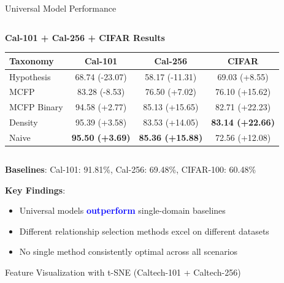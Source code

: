 \documentclass[aspectratio=169]{beamer}
\begin{document}
\begin{frame}{Universal Model Performance}
\begin{columns}[T]
        \begin{column}{0.48\textwidth}
            \textbf{Cal-101 + Cal-256 + CIFAR Results}
            \begin{table}[h]
                \centering
                \tiny
                \begin{tabular}{lccc}
                    \toprule
                    \textbf{Taxonomy} & \textbf{Cal-101}       & \textbf{Cal-256}        & \textbf{CIFAR}          \\
                    \midrule
                    Hypothesis        & 68.74 (-23.07)         & 58.17 (-11.31)          & 69.03 (+8.55)           \\
                    MCFP              & 83.28 (-8.53)          & 76.50 (+7.02)           & 76.10 (+15.62)          \\
                    MCFP Binary       & 94.58 (+2.77)          & 85.13 (+15.65)          & 82.71 (+22.23)          \\
                    Density           & 95.39 (+3.58)          & 83.53 (+14.05)          & \textbf{83.14 (+22.66)} \\
                    Naive             & \textbf{95.50 (+3.69)} & \textbf{85.36 (+15.88)} & 72.56 (+12.08)          \\
                    \bottomrule
                \end{tabular}
            \end{table}
        \end{column}
    \end{columns}

    \vspace{0.5em}

    \textbf{Baselines}: Cal-101: 91.81\%, Cal-256: 69.48\%, CIFAR-100: 60.48\%

    \textbf{Key Findings}:
    \begin{itemize}
        \item Universal models \textcolor{blue}{\textbf{outperform}} single-domain baselines
        \item Different relationship selection methods excel on different datasets
        \item No single method consistently optimal across all scenarios
    \end{itemize}
\end{frame}

\begin{frame}{Feature Visualization with t-SNE (Caltech-101 + Caltech-256)}
    \begin{center}
        \resizebox{0.65\textwidth}{!}{}
    \end{center}
\end{frame}
\end{document}
